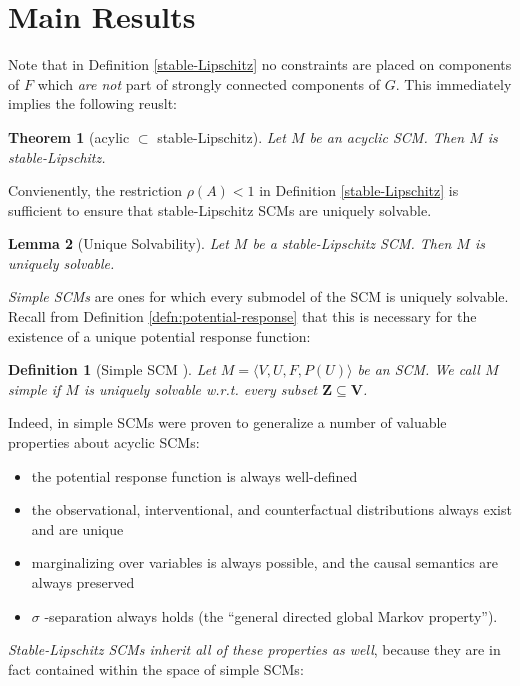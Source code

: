 \documentclass[letterpaper,10pt]{article}
\newtheorem{theorem}{Theorem}
\newtheorem{lemma}[theorem]{Lemma}
\newtheorem{definition}{Definition}
\begin{document}
\section{Main Results}\label{main}

Note that in Definition \ref{stable-Lipschitz} no constraints are placed on components of $F$ which \emph{are not} part of strongly connected components of $G$. This immediately implies the following reuslt:

\begin{theorem}[acylic $\subset$ stable-Lipschitz] \label{acyclic-subset}
Let $M$ be an acyclic SCM. Then $M$ is stable-Lipschitz.
\end{theorem}

Convienently, the restriction $\rho(A)<1$ in Definition \ref{stable-Lipschitz} is sufficient to ensure that stable-Lipschitz SCMs are uniquely solvable.

\begin{lemma}[Unique Solvability] \label{unique-solvable}
Let $M$ be a stable-Lipschitz SCM. Then $M$ is uniquely solvable.
\end{lemma}

\emph{Simple SCMs} are ones for which every submodel of the SCM is uniquely solvable. Recall from Definition \ref{defn:potential-response} that this is necessary for the existence of a unique potential response function:

\begin{definition}[Simple SCM \cite{Foundations}]
Let $M=\langle V,U,F,P(U)\rangle$ be an SCM. 
We call $M$ simple if $M$ is uniquely solvable w.r.t. every subset $\mathbf{Z}\subseteq\mathbf{V}$.
\end{definition}

Indeed, in \cite{Foundations} simple SCMs were proven to generalize a number of valuable properties about acyclic SCMs: 
\begin{itemize}
  \item the potential response function is always well-defined
  \item the observational, interventional, and counterfactual distributions always exist and are unique
  \item marginalizing over variables is always possible, and the causal semantics are always preserved
  \item $\sigma$ -separation always holds (the “general directed global Markov property”).
\end{itemize}

\emph{Stable-Lipschitz SCMs inherit all of these properties as well}, because they are in fact contained within the space of simple SCMs:
\end{document}
